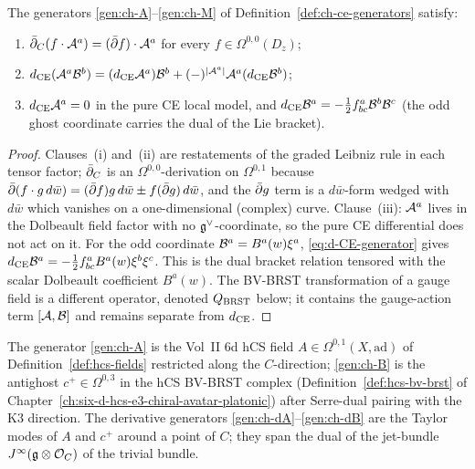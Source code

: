 \begin{proposition}
\label{prop:ch-ce-omega-linearity}
The generators \eqref{gen:ch-A}--\eqref{gen:ch-M} of
Definition~\ref{def:ch-ce-generators} satisfy:
\begin{enumerate}[label=\textup{(\roman*)}]
\item $\bar\partial_C(f\cdot\mathcal{A}^a) = (\bar\partial f)\cdot\mathcal{A}^a$ for every
$f\in\Omega^{0,0}(D_z)$;
\item $d_{\mathrm{CE}}(\mathcal{A}^a\mathcal{B}^b) = (d_{\mathrm{CE}}\mathcal{A}^a)\mathcal{B}^b + (-)^{|\mathcal{A}^a|}
\mathcal{A}^a(d_{\mathrm{CE}}\mathcal{B}^b)$;
\item $d_{\mathrm{CE}}\mathcal{A}^a = 0$ in the pure CE local model, and
$d_{\mathrm{CE}}\mathcal{B}^a = -\tfrac12 f^a_{bc}\mathcal{B}^b\mathcal{B}^c$
(the odd ghost coordinate carries the dual of the Lie bracket).
\end{enumerate}
\end{proposition}

\begin{proof}
Clauses~(i) and~(ii) are restatements of the graded Leibniz rule in
each tensor factor; $\bar\partial_C$ is an $\Omega^{0,0}$-derivation on
$\Omega^{0,1}$ because $\bar\partial(f\cdot g\,d\bar w) = (\bar\partial f)g\,d\bar w
\pm f(\bar\partial g)\,d\bar w$, and the $\bar\partial g$ term is a $d\bar w$-form
wedged with $d\bar w$ which vanishes on a one-dimensional (complex)
curve. Clause~(iii): $\mathcal{A}^a$ lives in the Dolbeault field factor with
no $\mathfrak{g}^\vee$-coordinate, so the pure CE differential does not act on
it. For the odd coordinate $\mathcal{B}^a=B^a(w)\xi^a$,
\eqref{eq:d-CE-generator} gives
$d_{\mathrm{CE}}\mathcal{B}^a=-\tfrac12 f^a_{bc}B^a(w)\xi^b\xi^c$. This is the dual
bracket relation tensored with the scalar Dolbeault coefficient
$B^a(w)$. The BV-BRST transformation of a gauge field is a different
operator, denoted $Q_{\mathrm{BRST}}$ below; it contains the gauge-action term
$[\mathcal{A},\mathcal{B}]$ and remains separate from $d_{\mathrm{CE}}$.
\end{proof}

\begin{remark}
\label{rem:ch-ce-match-6d-bv}
%
The generator \eqref{gen:ch-A} is the Vol~II 6d hCS field
$A\in\Omega^{0,1}(X,\mathrm{ad})$ of
Definition~\ref{def:hcs-fields} restricted along the $C$-direction;
\eqref{gen:ch-B} is the antighost
$c^+\in\Omega^{0,3}$ in the hCS BV-BRST complex
(Definition~\ref{def:hcs-bv-brst} of
Chapter~\ref{ch:six-d-hcs-e3-chiral-avatar-platonic}) after Serre-dual
pairing with the K3 direction. The derivative generators
\eqref{gen:ch-dA}--\eqref{gen:ch-dB} are the Taylor modes of
$A$ and $c^+$ around a point of $C$; they span the dual of the
jet-bundle $J^\infty(\mathfrak{g}\otimes\mathcal{O}_C)$ of the trivial bundle.
\end{remark}

